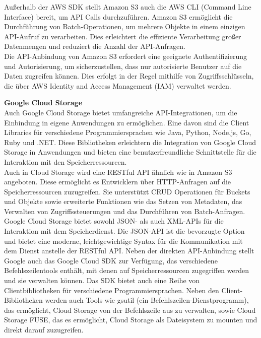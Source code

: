 Außerhalb der AWS SDK stellt Amazon S3 auch die AWS CLI (Command Line Interface) bereit, um API Calls durchzuführen. Amazon S3 ermöglicht die Durchführung von Batch-Operationen, um mehrere Objekte in einem einzigen API-Aufruf zu verarbeiten. Dies erleichtert die effiziente Verarbeitung großer Datenmengen und reduziert die Anzahl der API-Anfragen.\\

Die API-Anbindung von Amazon S3 erfordert eine geeignete Authentifizierung und Autorisierung, um sicherzustellen, dass nur autorisierte Benutzer auf die Daten zugreifen können. Dies erfolgt in der Regel mithilfe von Zugriffsschlüsseln, die über AWS Identity and Access Management (IAM) verwaltet werden.

\newpage

\textbf{Google Cloud Storage}\\

Auch Google Cloud Storage bietet umfangreiche API-Integrationen, um die Einbindung in eigene Anwendungen zu ermöglichen. Eine davon sind die Client Libraries für verschiedene Programmiersprachen wie Java, Python, Node.js, Go, Ruby und .NET. Diese Bibliotheken erleichtern die Integration von Google Cloud Storage in Anwendungen und bieten eine benutzerfreundliche Schnittstelle für die Interaktion mit den Speicherressourcen.\\ Auch in Cloud Storage wird eine RESTful API ähnlich wie in Amazon S3 angeboten. Diese ermöglicht es Entwicklern über HTTP-Anfragen auf die Speicherressourcen zuzugreifen. Sie unterstützt CRUD Operationen für Buckets und Objekte sowie erweiterte Funktionen wie das Setzen von Metadaten, das Verwalten von Zugriffssteuerungen und das Durchführen von Batch-Anfragen.\\

Google Cloud Storage bietet sowohl JSON- als auch XML-APIs für die Interaktion mit dem Speicherdienst. Die JSON-API ist die bevorzugte Option und bietet eine moderne, leichtgewichtige Syntax für die Kommunikation mit dem Dienst anstelle der RESTful API. Neben der direkten API-Anbindung stellt Google auch das Google Cloud SDK zur Verfügung, das verschiedene Befehlszeilentools enthält, mit denen auf Speicherressourcen zugegriffen werden und sie verwalten können. Das SDK bietet auch eine Reihe von Clientbibliotheken für verschiedene Programmiersprachen. Neben den Client-Bibliotheken werden auch Tools wie gsutil (ein Befehlszeilen-Dienstprogramm), das ermöglicht, Cloud Storage von der Befehlszeile aus zu verwalten, sowie Cloud Storage FUSE, das es ermöglicht, Cloud Storage als Dateisystem zu mounten und direkt darauf zuzugreifen.\\


